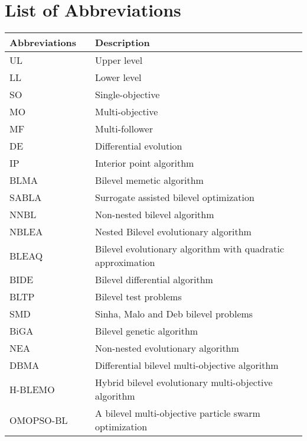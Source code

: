 \chapter*{List of Abbreviations}
\pagestyle{plain}

\begin{longtable}[l]{p{}  p{}    p{}}
\hline \hline
\textbf{Abbreviations}	 & &\textbf{Description} \\
\hline \hline
UL      & & Upper level \\
LL      & & Lower level \\
SO      & & Single-objective \\
MO      & & Multi-objective \\
MF      & & Multi-follower\\
DE      & & Differential evolution\\
IP      & & Interior point algorithm\\
BLMA    & & Bilevel memetic algorithm \\
SABLA   & & Surrogate assisted bilevel optimization \\
NNBL    & & Non-nested bilevel algorithm \\
NBLEA   & & Nested Bilevel evolutionary algorithm\\
BLEAQ   & & Bilevel evolutionary algorithm with quadratic approximation\\
BIDE    & & Bilevel differential algorithm\\
BLTP    & & Bilevel test problems\\
SMD     & & Sinha, Malo and Deb bilevel problems\\ 
BiGA    & & Bilevel genetic algorithm\\
NEA     & & Non-nested evolutionary algorithm \\
DBMA    & & Differential bilevel multi-objective algorithm \\
H-BLEMO   & & Hybrid bilevel evolutionary multi-objective algorithm \\
OMOPSO-BL & & A bilevel multi-objective particle swarm optimization \\
\hline \hline
\end{longtable}


